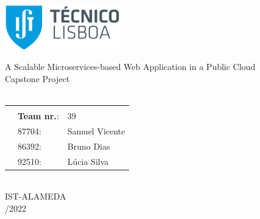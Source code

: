 \thispagestyle {empty}
\includegraphics[width=5cm]{./pictures/IST_A_RGB_POS.png}
\begin{center}
\vspace{5.0cm}
%
{\FontLb A Scalable Microservices-based Web Application in a
Public Cloud} \\
\vspace{0.2cm}
%
{\FontMn Capstone Project} \\
\vspace{1.0cm}
{\FontLn \tlangCourse} \\
\vspace*{1.0cm}
\begin{center}
\begin{tabular}{r@{~}l l}
    \multicolumn{3}{c}{\bfseries\textbf{ }} \\
    & \textbf{Team nr.}: & 39 \\
    & 87704: & Samuel Vicente \\
    & 86392: & Bruno Dias \\
    & 92510: & Lúcia Silva \\ %
\end{tabular}
\end{center}
\vspace*{2.0cm}
{\FontMb \tlangDegree} \\
{\FontMb IST-ALAMEDA} \\
\vspace{1.5cm}
{/2022} \\
\end{center}